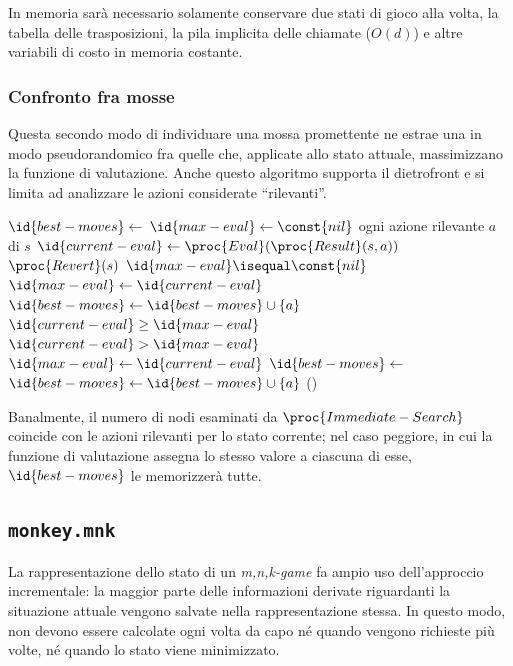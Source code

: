 \documentclass{article}
\begin{document}
In memoria sarà necessario solamente conservare due stati di gioco alla volta,
la tabella delle trasposizioni, la pila implicita delle chiamate ($O(d)$) e
altre variabili di costo in memoria costante.

\subsubsection{Confronto fra mosse}

Questa secondo modo di individuare una mossa promettente ne estrae una in modo
pseudorandomico fra quelle che, applicate allo stato attuale, massimizzano la
funzione di valutazione. Anche questo algoritmo supporta il dietrofront e si
limita ad analizzare le azioni considerate ``rilevanti''.

\begin{codebox}
  \li  $\id{best-moves} \gets$
       {\emph{}}
  \li  $\id{max-eval} \gets \const{nil}$
  \li \For ogni azione rilevante $a$ di $s$
  \li   \Do
          $\id{current-eval} \gets \proc{Eval}(\proc{Result}(s, a))$
  \li     $\proc{Revert}(s)$
  \li     \If $\id{max-eval} \isequal \const{nil}$
  \li       \Then
              $\id{max-eval} \gets \id{current-eval}$
  \li         $\id{best-moves} \gets \id{best-moves} \cup \{ a \}$
  \li     \ElseIf $\id{current-eval} \geq \id{max-eval}$
  \li       \Then
              \If $\id{current-eval} > \id{max-eval}$
  \li           \Then
                  $\id{max-eval} \gets \id{current-eval}$
  \li             $\id{best-moves} \gets$
                  {\emph{}}
                \End
  \li         $\id{best-moves} \gets \id{best-moves} \cup \{ a \}$
          \End
        \End
  \li  \Return {}()
\end{codebox}

Banalmente, il numero di nodi esaminati da $\proc{Immediate-Search}$ coincide
con le azioni rilevanti per lo stato corrente; nel caso peggiore, in cui la
funzione di valutazione assegna lo stesso valore a ciascuna di esse,
$\id{best-moves}$ le memorizzerà tutte.

\subsection{\texttt{monkey.mnk}}

La rappresentazione dello stato di un \emph{m,n,k-game} fa ampio uso
dell'approccio incrementale: la maggior parte delle informazioni derivate
riguardanti la situazione attuale vengono salvate nella rappresentazione stessa.
In questo modo, non devono essere calcolate ogni volta da capo né quando vengono
richieste più volte, né quando lo stato viene minimizzato.
\end{document}
